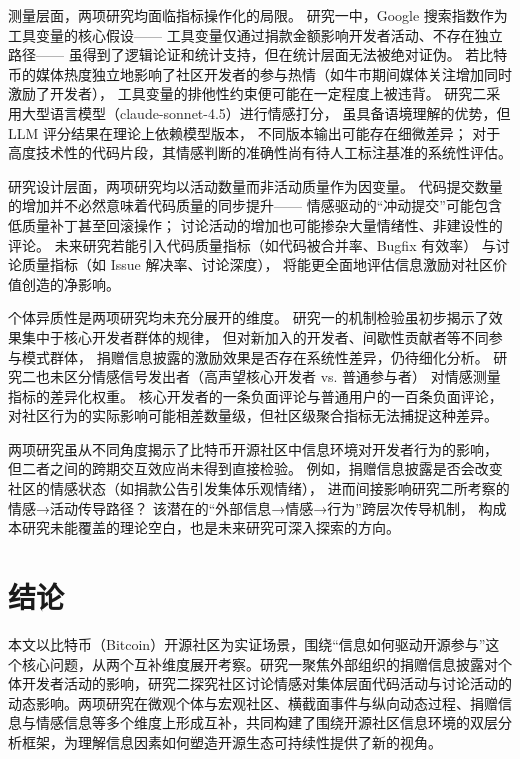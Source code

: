 \documentclass[
    type = master, %
    degree = professional,        %
    decl-page,  %
    twoside,                %
    fontset = fandol %
  ]{njuthesis}
\begin{document}
测量层面，两项研究均面临指标操作化的局限。
研究一中，Google 搜索指数作为工具变量的核心假设——
工具变量仅通过捐款金额影响开发者活动、不存在独立路径——
虽得到了逻辑论证和统计支持，但在统计层面无法被绝对证伪。
若比特币的媒体热度独立地影响了社区开发者的参与热情（如牛市期间媒体关注增加同时激励了开发者），
工具变量的排他性约束便可能在一定程度上被违背。
研究二采用大型语言模型（claude-sonnet-4.5）进行情感打分，
虽具备语境理解的优势，但 LLM 评分结果在理论上依赖模型版本，
不同版本输出可能存在细微差异；
对于高度技术性的代码片段，其情感判断的准确性尚有待人工标注基准的系统性评估。

研究设计层面，两项研究均以活动数量而非活动质量作为因变量。
代码提交数量的增加并不必然意味着代码质量的同步提升——
情感驱动的“冲动提交”可能包含低质量补丁甚至回滚操作；
讨论活动的增加也可能掺杂大量情绪性、非建设性的评论。
未来研究若能引入代码质量指标（如代码被合并率、Bugfix 有效率）
与讨论质量指标（如 Issue 解决率、讨论深度），
将能更全面地评估信息激励对社区价值创造的净影响。

个体异质性是两项研究均未充分展开的维度。
研究一的机制检验虽初步揭示了效果集中于核心开发者群体的规律，
但对新加入的开发者、间歇性贡献者等不同参与模式群体，
捐赠信息披露的激励效果是否存在系统性差异，仍待细化分析。
研究二也未区分情感信号发出者（高声望核心开发者 vs. 普通参与者）
对情感测量指标的差异化权重。
核心开发者的一条负面评论与普通用户的一百条负面评论，
对社区行为的实际影响可能相差数量级，但社区级聚合指标无法捕捉这种差异。

两项研究虽从不同角度揭示了比特币开源社区中信息环境对开发者行为的影响，
但二者之间的跨期交互效应尚未得到直接检验。
例如，捐赠信息披露是否会改变社区的情感状态（如捐款公告引发集体乐观情绪），
进而间接影响研究二所考察的情感→活动传导路径？
该潜在的“外部信息→情感→行为”跨层次传导机制，
构成本研究未能覆盖的理论空白，也是未来研究可深入探索的方向。



\chapter{结论}

本文以比特币（Bitcoin）开源社区为实证场景，围绕“信息如何驱动开源参与”这个核心问题，从两个互补维度展开考察。研究一聚焦外部组织的捐赠信息披露对个体开发者活动的影响，研究二探究社区讨论情感对集体层面代码活动与讨论活动的动态影响。两项研究在微观个体与宏观社区、横截面事件与纵向动态过程、捐赠信息与情感信息等多个维度上形成互补，共同构建了围绕开源社区信息环境的双层分析框架，为理解信息因素如何塑造开源生态可持续性提供了新的视角。
\end{document}
